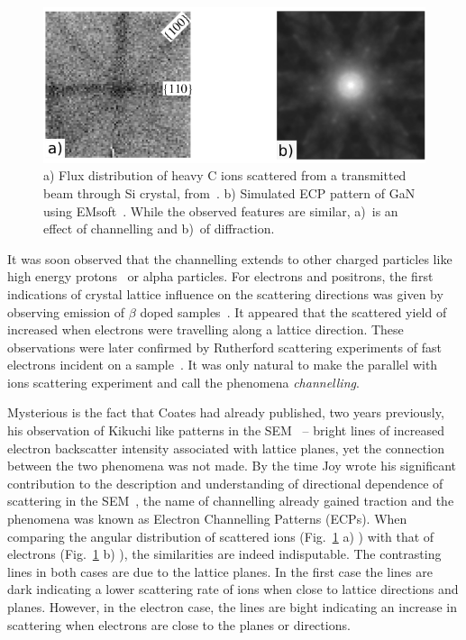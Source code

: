\begin{figure}[!h]
    \centering
\includegraphics[width=0.66\linewidth]{Figures/icp-ecp.png}
\caption{ a) Flux distribution of heavy C ions scattered from a transmitted beam through \hkl[001] Si crystal, from~\cite{Assmann99}. b) Simulated ECP pattern of \hkl[001] GaN using EMsoft~\cite{EMsoft}. While the observed features are similar, a)~is an effect of channelling and b)~of diffraction.}
\label{Fig:icp}
\end{figure}





It was soon observed that the channelling extends to other charged particles like high energy protons~\cite{Dearnaley68} or alpha particles. For electrons and positrons, the first indications of crystal lattice influence on the scattering directions was given by observing emission of $\beta$ doped samples~\cite{Uggerhoj68}. It appeared that the scattered yield of increased when electrons were travelling along a lattice direction. These observations were later confirmed by Rutherford scattering experiments of fast electrons incident on a sample~\cite{Uggerhoj69}. It was only natural to make the parallel with ions scattering experiment and call the phenomena \textit{channelling}.  

Mysterious is the fact that Coates had already published, two years previously, his observation of Kikuchi like patterns in the SEM~\cite{Coates67} -- bright lines of increased electron backscatter intensity associated with lattice planes, yet the connection between the two phenomena was not made. By the time Joy wrote his significant contribution to the description and understanding of directional dependence of scattering in the SEM~\cite{Joy82}, the name of channelling already gained traction and the phenomena was known as Electron Channelling Patterns (ECPs). When comparing the angular distribution of scattered ions (Fig.~\ref{Fig:icp} a) ) with that of electrons (Fig.~\ref{Fig:icp} b) ), the similarities are indeed indisputable. The contrasting lines in both cases are due to the lattice planes. In the first case the lines are dark indicating a lower scattering rate of ions when close to lattice directions and planes. However, in the electron case, the lines are bight indicating an increase in scattering when electrons are close to the planes or directions. 

